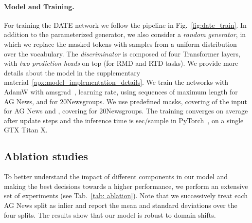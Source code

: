 \documentclass[11pt]{article}
\begin{document}
\paragraph{Model and Training.} For training the DATE network we follow the pipeline in Fig.~\ref{fig:date_train}. In addition to the parameterized generator, we also consider a \emph{random generator}, in which we replace the masked tokens with samples from a uniform distribution over the vocabulary.
The \emph{discriminator} is composed of four Transformer layers, with \emph{two prediction heads} on top (for RMD and RTD tasks). We provide more details about the model in the supplementary material~\ref{apx:model_implementation_details}. We train the networks with AdamW with amsgrad~\cite{adamw-amsgrad},  learning rate, using sequences of maximum length  for AG News, and  for 20Newsgroups. We use  predefined masks, covering  of the input for AG News and , covering  for 20Newsgroups. The training converges on average after  update steps and the inference time is  sec/sample in PyTorch~\cite{pytorch}, on a single GTX Titan X.



\subsection{Ablation studies}
\label{sec: ex-ablation}
To better understand the impact of different components in our model and making the best decisions towards a higher performance, we perform an extensive set of experiments (see Tab.~\ref{tab: ablation}). Note that we successively treat each AG News split as inlier and report the mean and standard deviations over the four splits. The results show that our model is robust to domain shifts.
\end{document}
